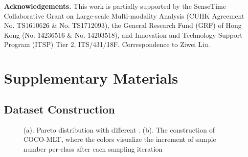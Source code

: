 \documentclass[runningheads]{llncs}
\begin{document}
\noindent\textbf{Acknowledgements.}
This work is partially supported by the SenseTime Collaborative Grant on Large-scale Multi-modality Analysis (CUHK Agreement No. TS1610626 \& No. TS1712093), the General Research Fund (GRF) of Hong Kong (No. 14236516 \& No. 14203518), and Innovation and Technology Support Program (ITSP) Tier 2, ITS/431/18F. Correspondence to Ziwei Liu.
 

 

\clearpage
\appendix
\section{Supplementary Materials}
\label{supplement}
\subsection{Dataset Construction}

\begin{figure}[hb] 
     \hfill
    \caption{
        (a). Pareto distribution with different .
        (b). The construction of COCO-MLT, where the colors visualize the increment of sample number per-class after each sampling iteration
    }
\end{figure}
\end{document}
